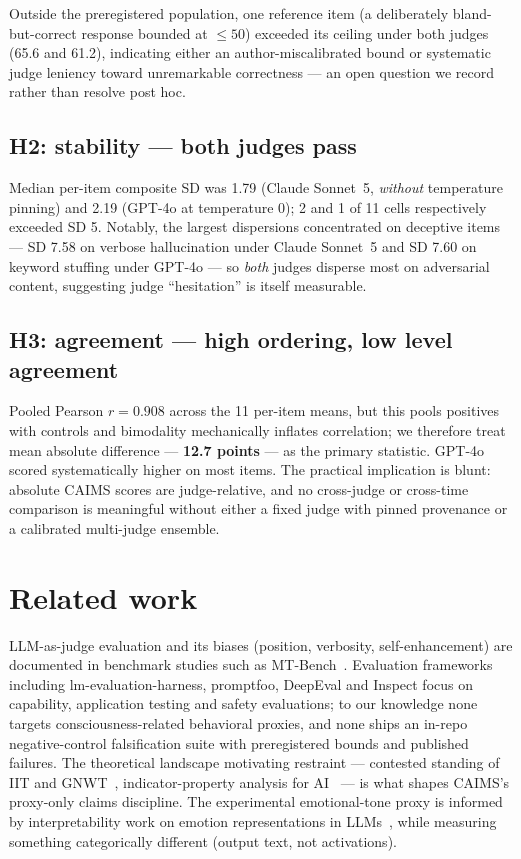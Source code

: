 \documentclass[11pt]{article}
\begin{document}
Outside the preregistered population, one reference item (a deliberately bland-but-correct response bounded at $\le 50$) exceeded its ceiling under both judges (65.6 and 61.2), indicating either an author-miscalibrated bound or systematic judge leniency toward unremarkable correctness --- an open question we record rather than resolve post hoc.

\subsection{H2: stability --- both judges pass}
Median per-item composite SD was 1.79 (Claude Sonnet~5, \emph{without} temperature pinning) and 2.19 (GPT-4o at temperature 0); 2 and 1 of 11 cells respectively exceeded SD 5. Notably, the largest dispersions concentrated on deceptive items --- SD 7.58 on verbose hallucination under Claude Sonnet~5 and SD 7.60 on keyword stuffing under GPT-4o --- so \emph{both} judges disperse most on adversarial content, suggesting judge ``hesitation'' is itself measurable.

\subsection{H3: agreement --- high ordering, low level agreement}
Pooled Pearson $r = 0.908$ across the 11 per-item means, but this pools positives with controls and bimodality mechanically inflates correlation; we therefore treat mean absolute difference --- \textbf{12.7 points} --- as the primary statistic. GPT-4o scored systematically higher on most items. The practical implication is blunt: absolute CAIMS scores are judge-relative, and no cross-judge or cross-time comparison is meaningful without either a fixed judge with pinned provenance or a calibrated multi-judge ensemble.

\section{Related work}
LLM-as-judge evaluation and its biases (position, verbosity, self-enhancement) are documented in benchmark studies such as MT-Bench~\cite{zheng2023}. Evaluation frameworks including lm-evaluation-harness, promptfoo, DeepEval and Inspect focus on capability, application testing and safety evaluations; to our knowledge none targets consciousness-related behavioral proxies, and none ships an in-repo negative-control falsification suite with preregistered bounds and published failures. The theoretical landscape motivating restraint --- contested standing of IIT and GNWT~\cite{cogitate2025}, indicator-property analysis for AI~\cite{butlin2023} --- is what shapes CAIMS's proxy-only claims discipline. The experimental emotional-tone proxy is informed by interpretability work on emotion representations in LLMs~\cite{anthropic2026emotions}, while measuring something categorically different (output text, not activations).
\end{document}
